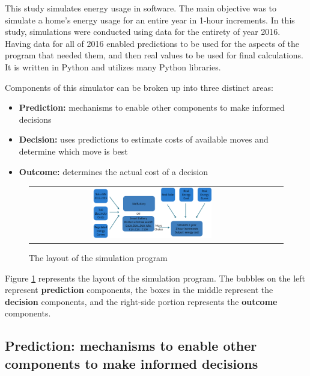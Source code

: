 This study simulates energy usage in software. The main objective was to simulate a home's energy usage for an entire year in 1-hour increments. In this study, simulations were conducted using data for the entirety of year 2016. Having data for all of 2016 enabled predictions to be used for the aspects of the program that needed them, and then real values to be used for final calculations. It is written in Python and utilizes many Python libraries.

Components of this simulator can be broken up into three distinct areas:

\begin{itemize}
  \item \textbf{Prediction:} mechanisms to enable other components to make informed decisions
  \item \textbf{Decision:} uses predictions to estimate costs of available moves and determine which move is best
  \item \textbf{Outcome:} determines the actual cost of a decision
\end{itemize}

\begin{figure}
 \begin{center}
  \begin{tabular}{cc}
   \includegraphics[width=0.50\textwidth]{./figures/image_1.png} \\
   \end{tabular}
   \end{center}
\caption{The layout of the simulation program}
  \vspace{+1mm}
\label{program_layout}
\end{figure}

Figure \ref{program_layout} represents the layout of the simulation program. The bubbles on the left represent \textbf{prediction} components, the boxes in the middle represent the \textbf{decision} components, and the right-side portion represents the \textbf{outcome} components.

\subsection{Prediction: mechanisms to enable other components to make informed decisions}

